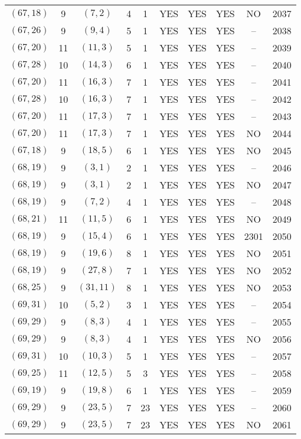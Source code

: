 \begin{longtable}{|c|c|c|c|c|c|c|c|c|c|}
$(67, 18)$ & 9 & $(7, 2)$ & 4 & 1 & YES & YES & YES & NO & 2037\\
$(67, 26)$ & 9 & $(9, 4)$ & 5 & 1 & YES & YES & YES & -- & 2038\\
$(67, 20)$ & 11 & $(11, 3)$ & 5 & 1 & YES & YES & YES & -- & 2039\\
$(67, 28)$ & 10 & $(14, 3)$ & 6 & 1 & YES & YES & YES & -- & 2040\\
$(67, 20)$ & 11 & $(16, 3)$ & 7 & 1 & YES & YES & YES & -- & 2041\\
$(67, 28)$ & 10 & $(16, 3)$ & 7 & 1 & YES & YES & YES & -- & 2042\\
$(67, 20)$ & 11 & $(17, 3)$ & 7 & 1 & YES & YES & YES & -- & 2043\\
$(67, 20)$ & 11 & $(17, 3)$ & 7 & 1 & YES & YES & YES & NO & 2044\\
$(67, 18)$ & 9 & $(18, 5)$ & 6 & 1 & YES & YES & YES & NO & 2045\\
$(68, 19)$ & 9 & $(3, 1)$ & 2 & 1 & YES & YES & YES & -- & 2046\\
$(68, 19)$ & 9 & $(3, 1)$ & 2 & 1 & YES & YES & YES & NO & 2047\\
$(68, 19)$ & 9 & $(7, 2)$ & 4 & 1 & YES & YES & YES & -- & 2048\\
$(68, 21)$ & 11 & $(11, 5)$ & 6 & 1 & YES & YES & YES & NO & 2049\\
$(68, 19)$ & 9 & $(15, 4)$ & 6 & 1 & YES & YES & YES & 2301 & 2050\\
$(68, 19)$ & 9 & $(19, 6)$ & 8 & 1 & YES & YES & YES & NO & 2051\\
$(68, 19)$ & 9 & $(27, 8)$ & 7 & 1 & YES & YES & YES & NO & 2052\\
$(68, 25)$ & 9 & $(31, 11)$ & 8 & 1 & YES & YES & YES & NO & 2053\\
$(69, 31)$ & 10 & $(5, 2)$ & 3 & 1 & YES & YES & YES & -- & 2054\\
$(69, 29)$ & 9 & $(8, 3)$ & 4 & 1 & YES & YES & YES & -- & 2055\\
$(69, 29)$ & 9 & $(8, 3)$ & 4 & 1 & YES & YES & YES & NO & 2056\\
$(69, 31)$ & 10 & $(10, 3)$ & 5 & 1 & YES & YES & YES & -- & 2057\\
$(69, 25)$ & 11 & $(12, 5)$ & 5 & 3 & YES & YES & YES & -- & 2058\\
$(69, 19)$ & 9 & $(19, 8)$ & 6 & 1 & YES & YES & YES & -- & 2059\\
$(69, 29)$ & 9 & $(23, 5)$ & 7 & 23 & YES & YES & YES & -- & 2060\\
$(69, 29)$ & 9 & $(23, 5)$ & 7 & 23 & YES & YES & YES & NO & 2061\\

\end{longtable}
